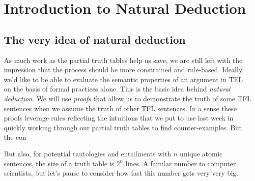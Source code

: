 
\section{Introduction to Natural Deduction}

\cite[][Chapter 16, pp. 110-2]{Mag25}
\cite[][Chapter 17, pp. 113-41]{Mag25}

\subsection{The very idea of natural deduction}

As much work as the partial truth tables help us save, we are still left with
the impression that the process should be more constrained and rule-based.
Ideally, we'd like to be able to evaluate the semantic properties of an
argument in TFL on the basis of formal practices alone. This is the basic
idea behind \emph{natural deduction}. We will use \emph{proofs} that allow us
to demonstrate the truth of some TFL sentences when we assume the truth of
other TFL sentences. In a sense these proofs leverage rules reflecting the
intuitions that we put to use last week in quickly working through our partial
truth tables to find counter-examples. But the con

But also, for potential tautologies and entailments with $n$ unique atomic
sentences, the size of a truth table is $2^n$ lines. A familar number to
computer scientists, but let's pause to consider how fast this number gets
very very big.

